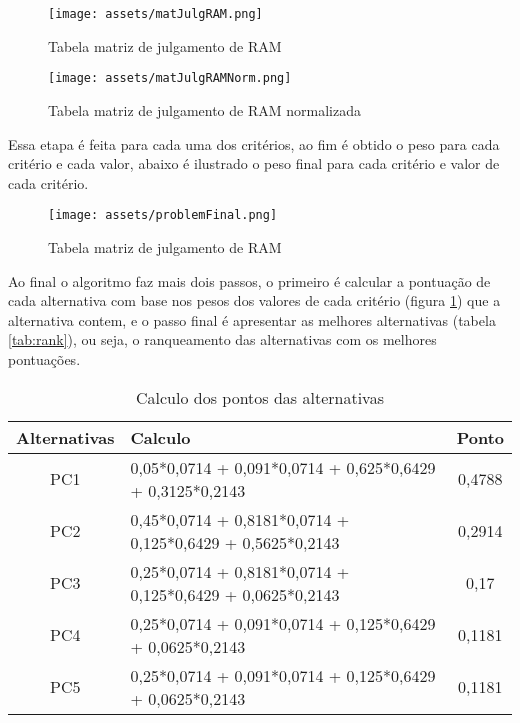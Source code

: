 \documentclass[12pt]{article}[abntex2]
\begin{document}
\begin{figure}[!ht]
\centering
\texttt{[image: assets/matJulgRAM.png]}
\caption{Tabela matriz de julgamento de RAM}
\label{tab:matJulgRAM}
\end{figure}
\newpage
\begin{figure}[!ht]
\centering
\texttt{[image: assets/matJulgRAMNorm.png]}
\caption{Tabela matriz de julgamento de RAM normalizada}
\label{fig:matJulgRAMNorm}
\end{figure}

Essa etapa é feita para cada uma dos critérios, ao fim é obtido o peso para cada critério e cada valor, abaixo é ilustrado o peso final para cada critério e valor de cada critério.

\begin{figure}[!ht]
\centering
\texttt{[image: assets/problemFinal.png]}
\caption{Tabela matriz de julgamento de RAM}
\label{tab:matJulgRAM}
\end{figure}

Ao final o algoritmo faz mais dois passos, o primeiro é calcular a pontuação de cada alternativa com base nos pesos dos valores de cada critério (figura \ref{tab:pts}) que a alternativa contem, e o passo final é apresentar as melhores alternativas (tabela \ref{tab:rank}), ou seja, o ranqueamento das alternativas com os melhores pontuações.

\newpage
\begin{table}[ht]
\centering
\begin{adjustbox}{width=1\textwidth}
\small
\begin{tabular}{|c|l|c|}
   \hline
   Alternativas  & Calculo & Ponto \\
   \hline
   PC1  &  0,05*0,0714 + 0,091*0,0714 + 0,625*0,6429 + 0,3125*0,2143 & 0,4788 \\
   PC2  & 0,45*0,0714 + 0,8181*0,0714 + 0,125*0,6429 + 0,5625*0,2143 & 0,2914\\
   PC3 & 0,25*0,0714 + 0,8181*0,0714 + 0,125*0,6429 + 0,0625*0,2143 & 0,17 \\
   PC4 & 0,25*0,0714 + 0,091*0,0714 + 0,125*0,6429 + 0,0625*0,2143 & 0,1181 \\
   PC5 & 0,25*0,0714 + 0,091*0,0714 + 0,125*0,6429 + 0,0625*0,2143 & 0,1181 \\
   \hline
\end{tabular}
\end{adjustbox}
\caption{Calculo dos pontos das alternativas}
\label{tab:pts}
\end{table} 
\end{document}
